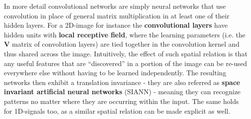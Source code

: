 
In more detail convolutional networks are simply neural networks that use convolution in place of general matrix multiplication in at least one of their hidden layers.
For a 2D-image for instance the \textbf{convolutional layers} have hidden units with \textbf{local receptive field}, where the learning parameters (i.e. the $\bm{V}$ matrix of convolution layers) are tied together in the convolution kernel and thus shared across the image. Intuitively, the effect of such spatial relation is that any useful features that are “discovered” in a portion
of the image can be re-used everywhere else without having to be learned independently. The resulting networks then exhibit a translation invariance - they are also referred as \textbf{space invariant artificial neural networks} (SIANN) - meaning they can recognize patterns no matter where they are occurring within the input.
The same holds for 1D-signals too, as a similar spatial relation can be made explicit as well.

